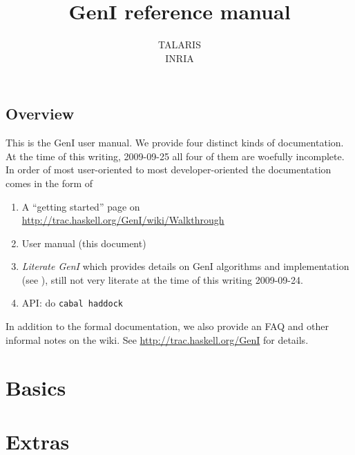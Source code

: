 \documentclass[a4paper,11pt]{report}
\begin{document}
\title{GenI reference manual}
\author{TALARIS\\INRIA}

\maketitle
\tableofcontents


\chapter{Overview}

This is the GenI user manual.  We provide four distinct kinds of
documentation.  At the time of this writing, 2009-09-25 all four of them
are woefully incomplete.  In order of most user-oriented to most
developer-oriented the documentation comes in the form of

\begin{enumerate}
\item A ``getting started'' page on\\
      \url{http://trac.haskell.org/GenI/wiki/Walkthrough}
\item User manual (this document)
\item \textit{Literate GenI} which provides details on GenI
      algorithms and implementation (see \cite{literateGeni}),
      still not very literate at the time of this writing
      2009-09-24.
\item API: do \verb!cabal haddock!
\end{enumerate}

In addition to the formal documentation, we also provide an FAQ and
other informal notes on the wiki.  See
\url{http://trac.haskell.org/GenI} for details.

\part{Basics}






\part{Extras}




{


}
\end{document}
